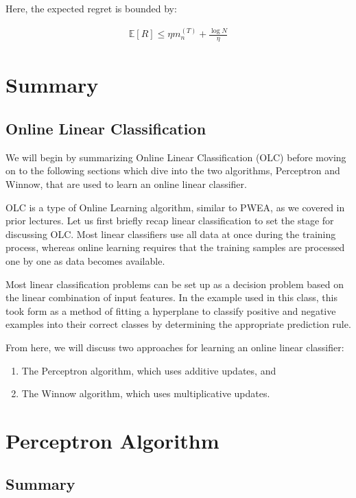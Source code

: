 \documentclass[11pt]{article}
\begin{document}
Here, the expected regret is bounded by:

\begin{align}
    \mathbb{E}[R] \leq \eta m_n^{(T)} + \frac{\log N}{\eta}
\end{align}


\section{Summary}
\subsection{Online Linear Classification}

We will begin by summarizing Online Linear Classification (OLC) before moving on to the following sections which dive into the two algorithms, Perceptron and Winnow, that are used to learn an online linear classifier. 

OLC is a type of Online Learning algorithm, similar to PWEA, as we covered in prior lectures. Let us first briefly recap linear classification to set the stage for discussing OLC. Most linear classifiers use all data at once during the training process, whereas online learning requires that the training samples are processed one by one as data becomes available. 

Most linear classification problems can be set up as a decision problem based on the linear combination of input features. In the example used in this class, this took form as a method of fitting a hyperplane to classify positive and negative examples into their correct classes by determining the appropriate prediction rule. 

From here, we will discuss two approaches for learning an online linear classifier: 

\begin{enumerate}
    \item The Perceptron algorithm, which uses additive updates, and
    \item The Winnow algorithm, which uses multiplicative updates.
\end{enumerate}


\section{Perceptron Algorithm}

\subsection{Summary}
\end{document}
